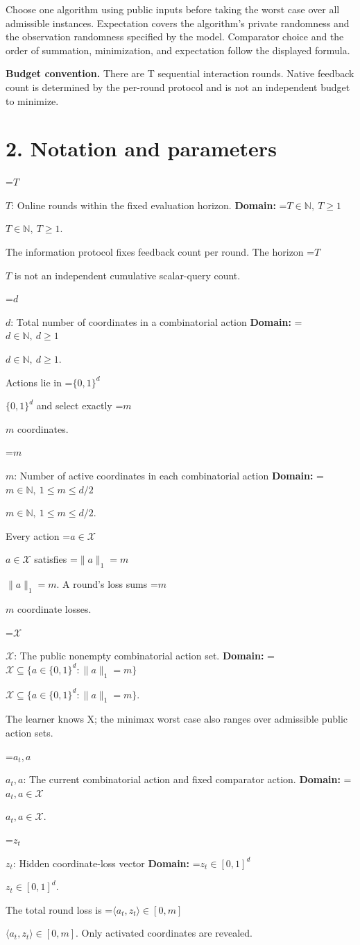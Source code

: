 \documentclass[10pt,a4paper]{article}
\newcommand{\AtlasMath}[1]{\par\begingroup\centering\setbox0=\hbox{$\displaystyle #1$}\ifdim\wd0>1.4\linewidth\typeout{ATLAS WIDE FORMULA: \the\wd0}\fi\ifdim\wd0>\linewidth\resizebox{\linewidth}{!}{\box0}\else\box0\fi\par\endgroup}
\newcommand{\AtlasInlineMath}[1]{\begingroup\setbox0=\hbox{$#1$}\ifdim\wd0>.4\linewidth\endgroup\AtlasMath{#1}\else\endgroup$#1$\fi}
\begin{document}
Choose one algorithm using public inputs before taking the worst case over all admissible instances. Expectation covers the algorithm's private randomness and the observation randomness specified by the model. Comparator choice and the order of summation, minimization, and expectation follow the displayed formula.

\textbf{Budget convention.} There are T sequential interaction rounds. Native feedback count is determined by the per-round protocol and is not an independent budget to minimize.

\section{2. Notation and parameters}
\AtlasInlineMath{T}: Online rounds within the fixed evaluation horizon. \textbf{Domain:} \AtlasInlineMath{T\in\mathbb N,\ T\ge1}.

The information protocol fixes feedback count per round. The horizon \AtlasInlineMath{T} is not an independent cumulative scalar-query count.

\AtlasInlineMath{d}: Total number of coordinates in a combinatorial action \textbf{Domain:} \AtlasInlineMath{d\in\mathbb N,\ d\ge1}.

Actions lie in \AtlasInlineMath{\{0,1\}^d} and select exactly \AtlasInlineMath{m} coordinates.

\AtlasInlineMath{m}: Number of active coordinates in each combinatorial action \textbf{Domain:} \AtlasInlineMath{m\in\mathbb N,\ 1\le m\le d/2}.

Every action \AtlasInlineMath{a\in\mathcal X} satisfies \AtlasInlineMath{\|a\|_1=m}. A round's loss sums \AtlasInlineMath{m} coordinate losses.

\AtlasInlineMath{\mathcal X}: The public nonempty combinatorial action set. \textbf{Domain:} \AtlasInlineMath{\mathcal X\subseteq\{a\in\{0,1\}^d:\|a\|_1=m\}}.

The learner knows X; the minimax worst case also ranges over admissible public action sets.

\AtlasInlineMath{a_t,a}: The current combinatorial action and fixed comparator action. \textbf{Domain:} \AtlasInlineMath{a_t,a\in\mathcal X}.

\AtlasInlineMath{z_t}: Hidden coordinate-loss vector \textbf{Domain:} \AtlasInlineMath{z_t\in[0,1]^d}.

The total round loss is \AtlasInlineMath{\langle a_t,z_t\rangle\in[0,m]}. Only activated coordinates are revealed.
\end{document}
